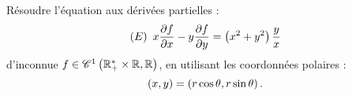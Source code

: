 \begin{exo}[Exercice 13]
Résoudre l'équation aux dérivées partielles : \[\left(E\right)~x\pdv{f}{x}-y\pdv{f}{y}=\left(x^2+y^2\right)\dfrac{y}{x}\] d'inconnue \(f\in\mathscr{C}^{1}\left(\mathbb{R}_+^*\times\mathbb{R},\mathbb{R}\right)\), en utilisant les coordonnées polaires : \[\left(x,y\right)=\left(r\cos\theta,r\sin\theta\right).\] 
\end{exo}

\begin{corr}
\end{corr}
